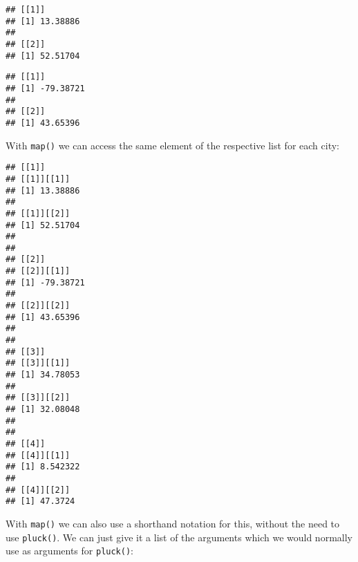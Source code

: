 \documentclass[]{book}
\newenvironment{Shaded}{\begin{snugshade}}{\end{snugshade}}
\newcommand{\DecValTok}[1]{\textcolor[rgb]{0.00,0.00,0.81}{#1}}
\newcommand{\KeywordTok}[1]{\textcolor[rgb]{0.13,0.29,0.53}{\textbf{#1}}}
\newcommand{\NormalTok}[1]{#1}
\newcommand{\OperatorTok}[1]{\textcolor[rgb]{0.81,0.36,0.00}{\textbf{#1}}}
\newcommand{\StringTok}[1]{\textcolor[rgb]{0.31,0.60,0.02}{#1}}
\begin{document}
\begin{verbatim}
## [[1]]
## [1] 13.38886
## 
## [[2]]
## [1] 52.51704
\end{verbatim}

\begin{Shaded}
\end{Shaded}

\begin{verbatim}
## [[1]]
## [1] -79.38721
## 
## [[2]]
## [1] 43.65396
\end{verbatim}

With \texttt{map()} we can access the same element of the respective list for each city:

\begin{Shaded}
\end{Shaded}

\begin{verbatim}
## [[1]]
## [[1]][[1]]
## [1] 13.38886
## 
## [[1]][[2]]
## [1] 52.51704
## 
## 
## [[2]]
## [[2]][[1]]
## [1] -79.38721
## 
## [[2]][[2]]
## [1] 43.65396
## 
## 
## [[3]]
## [[3]][[1]]
## [1] 34.78053
## 
## [[3]][[2]]
## [1] 32.08048
## 
## 
## [[4]]
## [[4]][[1]]
## [1] 8.542322
## 
## [[4]][[2]]
## [1] 47.3724
\end{verbatim}

With \texttt{map()} we can also use a shorthand notation for this, without the need to use \texttt{pluck()}.
We can just give it a list of the arguments which we would normally use as arguments for \texttt{pluck()}:

\begin{Shaded}
\end{Shaded}
\end{document}

